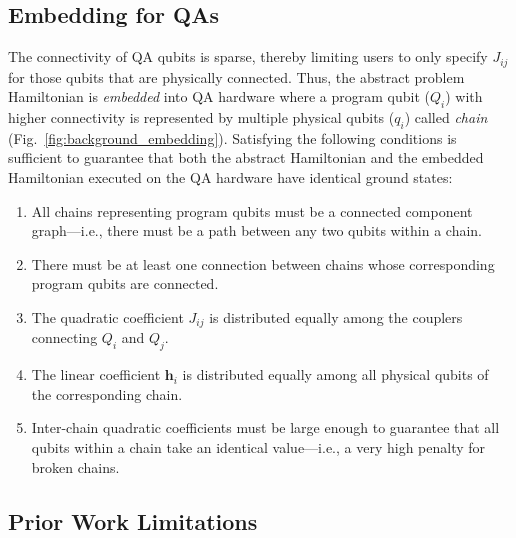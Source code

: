 \subsection{Embedding for QAs} \label{sec:embedding}    

The connectivity of QA qubits is sparse, thereby limiting users to only specify $J_{ij}$ for those qubits that are physically connected. 
Thus, the abstract problem Hamiltonian is \emph{embedded} into QA hardware where a program qubit ($Q_i$) with higher connectivity is represented by multiple physical qubits ($q_i$) called \emph{chain} (Fig.~\ref{fig:background_embedding}). 
Satisfying the following conditions is sufficient to guarantee that both the abstract Hamiltonian and the embedded Hamiltonian executed on the QA hardware have identical ground states:

\begin{enumerate}[ leftmargin=0.5cm,itemindent=0.cm,labelwidth=.5cm,labelsep=0cm,align=left, itemsep=0.2 cm, listparindent=0.5cm]

    \item 
All chains representing program qubits must be a connected component graph---i.e., there must be a path between any two qubits within a chain.

\item
There must be at least one connection between chains whose corresponding program qubits are connected.

\item
The quadratic coefficient $J_{ij}$ is distributed equally among the couplers connecting $Q_i$ and $Q_j$.

\item
The linear coefficient $\mathbf{h}_i$ is distributed equally among all physical qubits of the corresponding chain.

\item
Inter-chain quadratic coefficients must be large enough to guarantee that all qubits within a chain take an identical value---i.e., a very high penalty for broken chains.

\end{enumerate}



\subsection{Prior Work Limitations}

